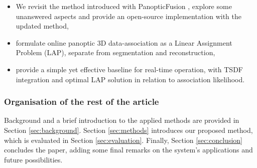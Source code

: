 \begin{itemize}
    \item[\textbullet] We revisit the method introduced with PanopticFusion \cite{panopticfusion}, explore some unanswered aspects and provide an open-source implementation with the updated method,
    \item[\textbullet] formulate online panoptic 3D data-association as a Linear Assignment Problem (LAP), separate from segmentation and reconstruction,
    \item[\textbullet] provide a simple yet effective baseline for real-time operation, with TSDF integration and optimal LAP solution in relation to association likelihood.
\end{itemize}

\subsubsection{Organisation of the rest of the article}

Background and a brief introduction to the applied methods are provided in Section \ref{sec:background}. Section \ref{sec:methods} introduces our proposed method, which is evaluated in Section \ref{sec:evaluation}. Finally, Section \ref{sec:conclusion} concludes the paper, adding some final remarks on the system's applications and future possibilities.